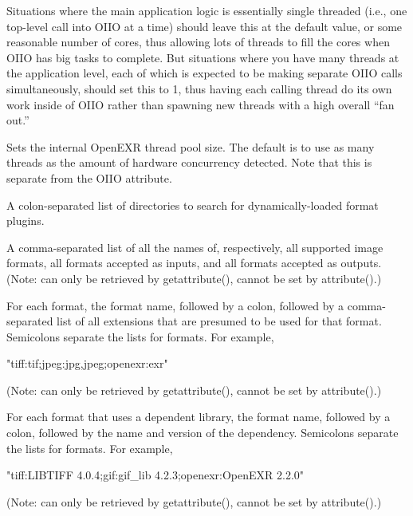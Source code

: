 Situations where the main application logic is essentially single threaded
(i.e., one top-level call into OIIO at a time) should leave this at the
default value, or some reasonable number of cores, thus allowing lots of
threads to fill the cores when OIIO has big tasks to complete. But
situations where you have many threads at the application level, each of
which is expected to be making separate OIIO calls simultaneously, should
set this to 1, thus having each calling thread do its own work inside of
OIIO rather than spawning new threads with a high overall ``fan out.''
\apiend

\vspace{10pt}
Sets the internal OpenEXR thread pool size. The default is to use as many
threads as the amount of hardware concurrency detected.
Note that this is separate from the OIIO
 attribute.
\apiend

\vspace{10pt}
A colon-separated list of directories to search for 
dynamically-loaded format plugins.
\apiend

\vspace{10pt}
  
A comma-separated list of all the names of, respectively, all supported
image formats, all formats accepted as inputs, and all formats accepted
as outputs.  (Note: can only be retrieved
by {\cf getattribute()}, cannot be set by {\cf attribute()}.)
\apiend

\vspace{10pt}
For each format, the format name, followed by a colon, followed by
a comma-separated list of all extensions that are presumed to be used
for that format.  Semicolons separate the lists for formats.  For
example,
\begin{code}
     "tiff:tif;jpeg:jpg,jpeg;openexr:exr"
\end{code}
(Note: can only be retrieved
by {\cf getattribute()}, cannot be set by {\cf attribute()}.)
\apiend

\vspace{10pt}
For each format that uses a dependent library, the format name, followed by
a colon, followed by the name and version of the dependency. Semicolons
separate the lists for formats.  For example,
\begin{code}
     "tiff:LIBTIFF 4.0.4;gif:gif_lib 4.2.3;openexr:OpenEXR 2.2.0"
\end{code}
(Note: can only be retrieved by {\cf getattribute()}, cannot be set by
{\cf attribute()}.)
\apiend

